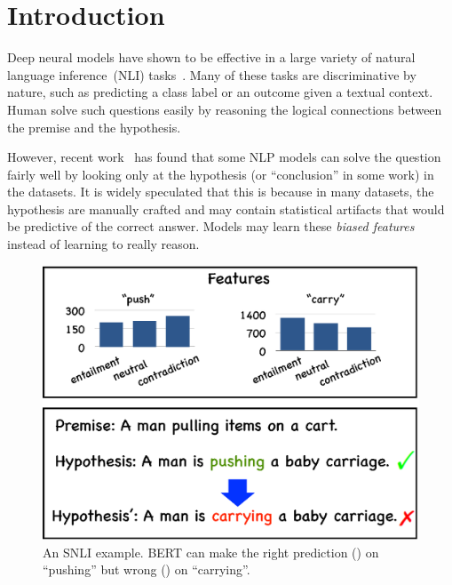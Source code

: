 \section{Introduction}
\label{sec:intro}
Deep neural models have shown to be effective in 
a large variety of natural language inference~(NLI)
tasks~\cite{bowman2015large,wang2018glue,mostafazadeh2016corpus,roemmele2011choice,zellers2018swag}. Many of these tasks
are discriminative by nature, such as predicting a class label or
an outcome given a textual context.
Human solve such questions easily by
reasoning the logical connections between the premise and the hypothesis.

However, recent work~\cite{naik2018stress,schuster2019towards} 
has found that some NLP models can solve the question
fairly well by looking only at the hypothesis (or ``conclusion'' in some work)
in the datasets. 
It is widely speculated that this is because in many datasets, 
the hypothesis are manually crafted and may contain statistical artifacts 
that would be predictive of the correct answer. 
Models may learn these {\em biased features} instead of learning 
to really reason.  

\begin{figure}[th]
\centering
\includegraphics[width=0.8\columnwidth]{picture/example.eps}
\caption{An SNLI example. BERT can make the right prediction
(\checksymbol) on ``pushing'' but wrong (\crosssymbol ) on ``carrying''.}
\label{fig:cue_def}
\end{figure}

